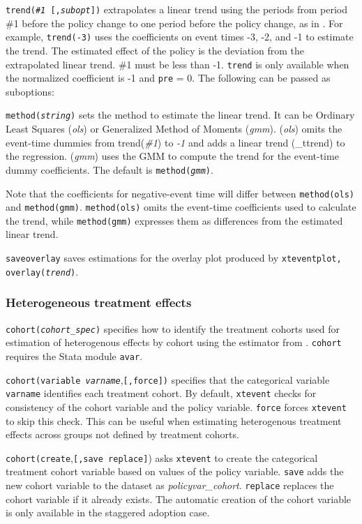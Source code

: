 \documentclass[12pt]{article}
\begin{document}
\hangpara
{\tt trend({\it \#1} [,{\it subopt}])} extrapolates a linear trend using the periods from period \#1 before the policy change to one period before the policy change, as in \citet{dobkin2018economic}.
For example, {\tt trend(-3)} uses the coefficients on event times -3, -2, and -1 to estimate the trend.
The estimated effect of the policy is the deviation from the extrapolated linear trend.
\#1 must be less than  -1.
{\tt trend} is only available when the normalized coefficient is -1 and {\tt pre} = 0.
The following can be passed as suboptions:

\morehangpara
{\tt method({\it string})} sets the method to estimate the linear trend.
It can be Ordinary Least Squares ({\it ols}) or Generalized Method of Moments ({\it gmm}).
({\it ols}) omits the event-time dummies from trend({\it \#1}) to {\it -1} and adds a linear trend (\_ttrend) to the regression.
({\it gmm}) uses the GMM to compute the trend for the event-time dummy coefficients.
The default is {\tt method({\it gmm})}.

\morehangpara
Note that the coefficients for negative-event time will differ between {\tt method(ols)} and {\tt method(gmm)}.
{\tt method(ols)} omits the event-time coefficients used to calculate the trend, while {\tt method(gmm)} expresses them as differences from the estimated linear trend.

\morehangpara
{\tt saveoverlay} saves estimations for the overlay plot produced by {\tt xteventplot, overlay({\it trend})}.

\subsubsection{Heterogeneous treatment effects \citep{sun2021estimating}}

\hangpara
{\tt cohort({\it cohort\_spec})} specifies how to identify the treatment cohorts used for estimation of heterogenous effects by cohort using the estimator from \cite{sun2021estimating}.
{\tt cohort} requires the Stata module {\tt avar}.

\morehangpara
{\tt cohort(variable \textit{varname}},{\tt [,force])} specifies that the categorical variable {\tt varname} identifies each treatment cohort.
By default, {\tt xtevent} checks for consistency of the cohort variable and the policy variable.
{\tt force} forces {\tt xtevent} to
skip this check.
This can be useful when estimating heterogenous treatment effects across groups not defined by treatment cohorts.

\morehangpara
{\tt cohort(create},{\tt [,save replace]}) asks {\tt xtevent} to create the categorical treatment cohort variable based on values of the policy variable.
{\tt save} adds the new cohort variable to the dataset as {\it policyvar\_cohort}.
{\tt replace} replaces the cohort variable if it already exists.
The automatic creation of the cohort variable is only available in the staggered adoption case.
\end{document}
